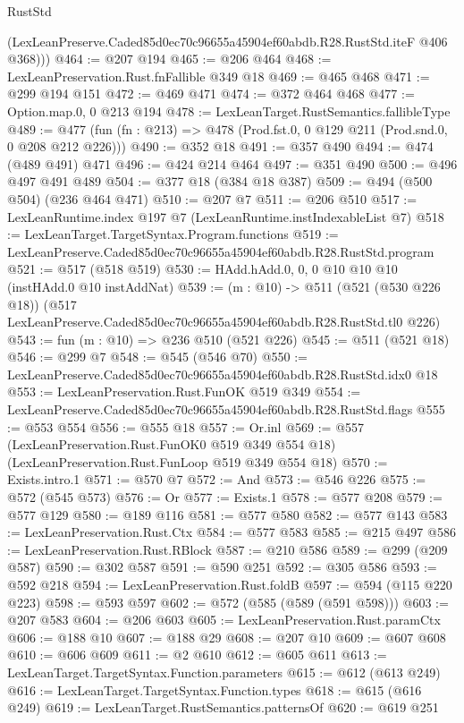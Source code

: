 \begin{lexlean}{RustStd}
\begin{coremodule}
        (LexLeanPreserve.Caded85d0ec70c96655a45904ef60abdb.R28.RustStd.iteF @406 @368)))
@464 := @207 @194
@465 := @206 @464
@468 := LexLeanPreservation.Rust.fnFallible @349 @18
@469 := @465 @468
@471 := @299 @194 @151
@472 := @469 @471
@474 := @372 @464 @468
@477 := Option.map.{0, 0} @213 @194
@478 := LexLeanTarget.RustSemantics.fallibleType
@489 := @477 (fun (fn : @213) => @478 (Prod.fst.{0, 0} @129 @211 (Prod.snd.{0, 0} @208 @212 @226)))
@490 := @352 @18
@491 := @357 @490
@494 := @474 (@489 @491) @471
@496 := @424 @214 @464
@497 := @351 @490
@500 := @496 @497 @491 @489
@504 := @377 @18 (@384 @18 @387)
@509 := @494 (@500 @504) (@236 @464 @471)
@510 := @207 @7
@511 := @206 @510
@517 := LexLeanRuntime.index @197 @7 (LexLeanRuntime.instIndexableList @7)
@518 := LexLeanTarget.TargetSyntax.Program.functions
@519 := LexLeanPreserve.Caded85d0ec70c96655a45904ef60abdb.R28.RustStd.program
@521 := @517 (@518 @519)
@530 := HAdd.hAdd.{0, 0, 0} @10 @10 @10 (instHAdd.{0} @10 instAddNat)
@539 := (m : @10) ->
  @511
    (@521 (@530 @226 @18))
    (@517 LexLeanPreserve.Caded85d0ec70c96655a45904ef60abdb.R28.RustStd.tl0 @226)
@543 := fun (m : @10) => @236 @510 (@521 @226)
@545 := @511 (@521 @18)
@546 := @299 @7
@548 := @545 (@546 @70)
@550 := LexLeanPreserve.Caded85d0ec70c96655a45904ef60abdb.R28.RustStd.idx0 @18
@553 := LexLeanPreservation.Rust.FunOK @519 @349
@554 := LexLeanPreserve.Caded85d0ec70c96655a45904ef60abdb.R28.RustStd.flags
@555 := @553 @554
@556 := @555 @18
@557 := Or.inl
@569 := @557
    (LexLeanPreservation.Rust.FunOK0 @519 @349 @554 @18)
    (LexLeanPreservation.Rust.FunLoop @519 @349 @554 @18)
@570 := Exists.intro.{1}
@571 := @570 @7
@572 := And
@573 := @546 @226
@575 := @572 (@545 @573)
@576 := Or
@577 := Exists.{1}
@578 := @577 @208
@579 := @577 @129
@580 := @189 @116
@581 := @577 @580
@582 := @577 @143
@583 := LexLeanPreservation.Rust.Ctx
@584 := @577 @583
@585 := @215 @497
@586 := LexLeanPreservation.Rust.RBlock
@587 := @210 @586
@589 := @299 (@209 @587)
@590 := @302 @587
@591 := @590 @251
@592 := @305 @586
@593 := @592 @218
@594 := LexLeanPreservation.Rust.foldB
@597 := @594 (@115 @220 @223)
@598 := @593 @597
@602 := @572 (@585 (@589 (@591 @598)))
@603 := @207 @583
@604 := @206 @603
@605 := LexLeanPreservation.Rust.paramCtx
@606 := @188 @10
@607 := @188 @29
@608 := @207 @10
@609 := @607 @608
@610 := @606 @609
@611 := @2 @610
@612 := @605 @611
@613 := LexLeanTarget.TargetSyntax.Function.parameters
@615 := @612 (@613 @249)
@616 := LexLeanTarget.TargetSyntax.Function.types
@618 := @615 (@616 @249)
@619 := LexLeanTarget.RustSemantics.patternsOf
@620 := @619 @251

\end{coremodule}
\end{lexlean}

